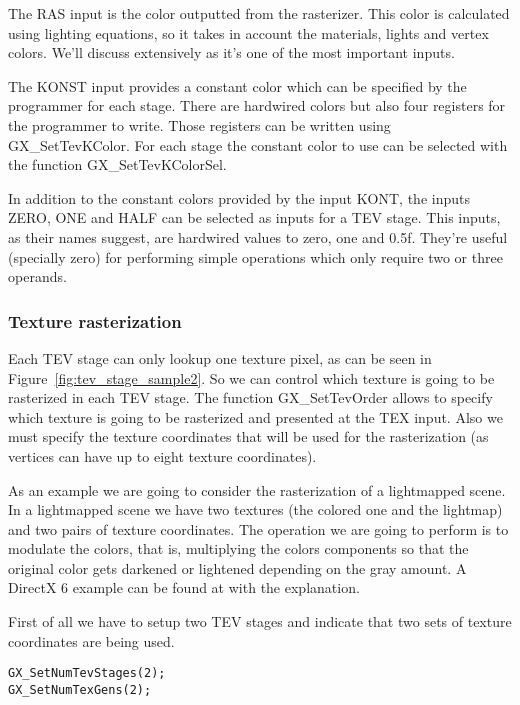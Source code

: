\documentclass[12pt]{article}
\newcommand{\fname}[1] {{\color{blue}#1}}
\begin{document}
The RAS input is the color outputted from the rasterizer. This color is calculated using lighting equations, so it takes in account the materials, lights and vertex colors. We'll discuss extensively as it's one of the most important inputs.

The KONST input provides a constant color which can be specified by the programmer for each stage. There are hardwired colors but also four registers for the programmer to write. Those registers can be written using \fname{GX\_SetTevKColor}. For each stage the constant color to use can be selected with the function \fname{GX\_SetTevKColorSel}.

In addition to the constant colors provided by the input KONT, the inputs ZERO, ONE and HALF can be selected as inputs for a TEV stage. This inputs, as their names suggest, are hardwired values to zero, one and 0.5f. They're useful (specially zero) for performing simple operations which only require two or three operands.

\subsubsection{ Texture rasterization }

Each TEV stage can only lookup one texture pixel, as can be seen in Figure~\ref{fig:tev_stage_sample2}. So we can control which texture is going to be rasterized in each TEV stage. The function \fname{GX\_SetTevOrder} allows to specify which texture is going to be rasterized and presented at the TEX input. Also we must specify the texture coordinates that will be used for the rasterization (as vertices can have up to eight texture coordinates).

As an example we are going to consider the rasterization of a lightmapped scene. In a lightmapped scene we have two textures (the colored one and the lightmap) and two pairs of texture coordinates. The operation we are going to perform is to modulate the colors, that is, multiplying the colors components so that the original color gets darkened or lightened depending on the gray amount. A DirectX 6 example can be found at \cite{dx6_mt} with the explanation.

First of all we have to setup two TEV stages and indicate that two sets of texture coordinates are being used.

\begin{lstlisting}[frame=single]
GX_SetNumTevStages(2);
GX_SetNumTexGens(2);
\end{lstlisting}
\end{document}
